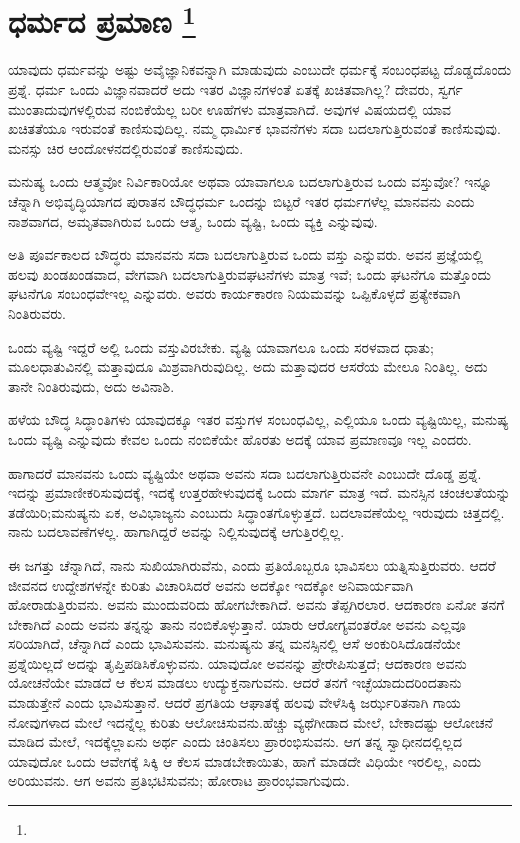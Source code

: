 
\chapter[ಧರ್ಮದ ಪ್ರಮಾಣ ]{ಧರ್ಮದ ಪ್ರಮಾಣ \protect\footnote{}}

ಯಾವುದು ಧರ್ಮವನ್ನು ಅಷ್ಟು ಅವೈಜ್ಞಾನಿಕವನ್ನಾಗಿ ಮಾಡುವುದು ಎಂಬುದೇ ಧರ್ಮಕ್ಕೆ ಸಂಬಂಧಪಟ್ಟ ದೊಡ್ಡದೊಂದು ಪ್ರಶ್ನೆ. ಧರ್ಮ ಒಂದು ವಿಜ್ಞಾನವಾದರೆ ಅದು ಇತರ ವಿಜ್ಞಾನಗಳಂತೆ ಏತಕ್ಕೆ ಖಚಿತವಾಗಿಲ್ಲ? ದೇವರು, ಸ್ವರ್ಗ ಮುಂತಾದುವುಗಳಲ್ಲಿರುವ ನಂಬಿಕೆಯೆಲ್ಲ ಬರೀ ಊಹೆಗಳು ಮಾತ್ರವಾಗಿದೆ. ಅವುಗಳ ವಿಷಯದಲ್ಲಿ ಯಾವ ಖಚಿತತೆಯೂ ಇರುವಂತೆ ಕಾಣಿಸುವುದಿಲ್ಲ. ನಮ್ಮ ಧಾರ್ಮಿಕ ಭಾವನೆಗಳು ಸದಾ ಬದಲಾಗುತ್ತಿರುವಂತೆ ಕಾಣಿಸುವುವು. ಮನಸ್ಸು ಚಿರ ಆಂದೋಳನದಲ್ಲಿರುವಂತೆ ಕಾಣಿಸುವುದು.

ಮನುಷ್ಯ ಒಂದು ಆತ್ಮವೋ ನಿರ್ವಿಕಾರಿಯೋ ಅಥವಾ ಯಾವಾಗಲೂ ಬದಲಾಗುತ್ತಿರುವ ಒಂದು ವಸ್ತುವೋ? ಇನ್ನೂ ಚೆನ್ನಾಗಿ ಅಭಿವೃದ್ಧಿಯಾಗದ ಪುರಾತನ ಬೌದ್ಧಧರ್ಮ ಒಂದನ್ನು ಬಿಟ್ಟರೆ ಇತರ ಧರ್ಮಗಳೆಲ್ಲ ಮಾನವನು ಎಂದು ನಾಶವಾಗದ, ಅಮೃತವಾಗಿರುವ ಒಂದು ಆತ್ಮ, ಒಂದು ವ್ಯಷ್ಟಿ, ಒಂದು ವ್ಯಕ್ತಿ ಎನ್ನುವುವು.

ಅತಿ ಪೂರ್ವಕಾಲದ ಬೌದ್ಧರು ಮಾನವನು ಸದಾ ಬದಲಾಗುತ್ತಿರುವ ಒಂದು ವಸ್ತು ಎನ್ನುವರು. ಅವನ ಪ್ರಜ್ಞೆಯಲ್ಲಿ ಹಲವು ಖಂಡಖಂಡವಾದ, ವೇಗವಾಗಿ ಬದಲಾಗುತ್ತಿರುವ\break ಘಟನೆಗಳು ಮಾತ್ರ ಇವೆ; ಒಂದು ಘಟನೆಗೂ ಮತ್ತೊಂದು ಘಟನೆಗೂ ಸಂಬಂಧವೇ\break ಇಲ್ಲ ಎನ್ನುವರು. ಅವರು ಕಾರ್ಯಕಾರಣ ನಿಯಮವನ್ನು ಒಪ್ಪಿಕೊಳ್ಳದೆ ಪ್ರತ್ಯೇಕವಾಗಿ ನಿಂತಿರುವರು.

ಒಂದು ವ್ಯಷ್ಟಿ ಇದ್ದರೆ ಅಲ್ಲಿ ಒಂದು ವಸ್ತುವಿರಬೇಕು. ವ್ಯಷ್ಟಿ ಯಾವಾಗಲೂ ಒಂದು ಸರಳವಾದ ಧಾತು; ಮೂಲಧಾತುವಿನಲ್ಲಿ ಮತ್ತಾವುದೂ ಮಿಶ್ರವಾಗಿರುವುದಿಲ್ಲ. ಅದು ಮತ್ತಾವುದರ ಆಸರೆಯ ಮೇಲೂ ನಿಂತಿಲ್ಲ. ಅದು ತಾನೇ ನಿಂತಿರುವುದು, ಅದು ಅವಿನಾಶಿ.

ಹಳೆಯ ಬೌದ್ಧ ಸಿದ್ಧಾಂತಿಗಳು ಯಾವುದಕ್ಕೂ ಇತರ ವಸ್ತುಗಳ ಸಂಬಂಧವಿಲ್ಲ, ಎಲ್ಲಿಯೂ ಒಂದು ವ್ಯಷ್ಟಿಯಿಲ್ಲ, ಮನುಷ್ಯ ಒಂದು ವ್ಯಷ್ಟಿ ಎನ್ನುವುದು ಕೇವಲ ಒಂದು ನಂಬಿಕೆಯೇ ಹೊರತು ಅದಕ್ಕೆ ಯಾವ ಪ್ರಮಾಣವೂ ಇಲ್ಲ ಎಂದರು.

ಹಾಗಾದರೆ ಮಾನವನು ಒಂದು ವ್ಯಷ್ಟಿಯೇ ಅಥವಾ ಅವನು ಸದಾ ಬದಲಾಗು\-ತ್ತಿರುವನೇ ಎಂಬುದೇ ದೊಡ್ಡ ಪ್ರಶ್ನೆ. ಇದನ್ನು ಪ್ರಮಾಣೀಕರಿಸುವುದಕ್ಕೆ, ಇದಕ್ಕೆ ಉತ್ತರ\break ಹೇಳುವುದಕ್ಕೆ ಒಂದು ಮಾರ್ಗ ಮಾತ್ರ ಇದೆ. ಮನಸ್ಸಿನ ಚಂಚಲತೆಯನ್ನು ತಡೆಯಿರಿ;\break ಮನುಷ್ಯನು ಏಕ, ಅವಿಭಾಜ್ಯನು ಎಂಬುದು ಸಿದ್ಧಾಂತಗೊಳ್ಳುತ್ತದೆ. ಬದಲಾವಣೆಯೆಲ್ಲ ಇರುವುದು ಚಿತ್ತದಲ್ಲಿ. ನಾನು ಬದಲಾವಣೆಗಳಲ್ಲ. ಹಾಗಾಗಿದ್ದರೆ ಅವನ್ನು ನಿಲ್ಲಿಸುವುದಕ್ಕೆ ಆಗುತ್ತಿರಲ್ಲಿಲ್ಲ.

ಈ ಜಗತ್ತು ಚೆನ್ನಾಗಿದೆ, ನಾನು ಸುಖಿಯಾಗಿರುವೆನು, ಎಂದು ಪ್ರತಿಯೊಬ್ಬರೂ ಭಾವಿಸಲು ಯತ್ನಿಸುತ್ತಿರುವರು. ಆದರೆ ಜೀವನದ ಉದ್ದೇಶಗಳನ್ನೇ ಕುರಿತು ವಿಚಾರಿಸಿದರೆ ಅವನು ಅದಕ್ಕೋ ಇದಕ್ಕೋ ಅನಿವಾರ್ಯವಾಗಿ ಹೋರಾಡುತ್ತಿರುವನು. ಅವನು ಮುಂದುವರಿದು ಹೋಗಬೇಕಾಗಿದೆ. ಅವನು ತೆಪ್ಪಗಿರಲಾರ. ಆದಕಾರಣ ಏನೋ ತನಗೆ ಬೇಕಾಗಿದೆ ಎಂದು ಅವನು ತನ್ನನ್ನು ತಾನು ನಂಬಿಕೊಳ್ಳುತ್ತಾನೆ. ಯಾರು ಆರೋಗ್ಯವಂತರೋ ಅವನು ಎಲ್ಲವೂ ಸರಿಯಾಗಿದೆ, ಚೆನ್ನಾಗಿದೆ ಎಂದು ಭಾವಿಸುವನು. ಮನುಷ್ಯನು ತನ್ನ ಮನಸ್ಸಿನಲ್ಲಿ ಆಸೆ ಅಂಕುರಿಸಿದೊಡನೆಯೇ ಪ್ರಶ್ನೆಯಿಲ್ಲದೆ ಅದನ್ನು ತೃಪ್ತಿಪಡಿಸಿಕೊಳ್ಳುವನು. ಯಾವುದೋ ಅವನನ್ನು ಪ್ರೇರೇಪಿಸುತ್ತದೆ; ಆದಕಾರಣ ಅವನು ಯೋಚನೆಯೇ ಮಾಡದೆ ಆ ಕೆಲಸ ಮಾಡಲು ಉದ್ಯುಕ್ತನಾಗುವನು. ಆದರೆ ತನಗೆ ಇಚ್ಛೆಯಾದುದರಿಂದ\break ತಾನು ಮಾಡುತ್ತೇನೆ ಎಂದು ಭಾವಿಸುತ್ತಾನೆ. ಆದರೆ ಪ್ರಗತಿಯ ಆಘಾತಕ್ಕೆ ಹಲವು ವೇಳೆ\break ಸಿಕ್ಕಿ ಜರ್ಝರಿತನಾಗಿ ಗಾಯ ನೋವುಗಳಾದ ಮೇಲೆ ಇದನ್ನೆಲ್ಲ ಕುರಿತು ಆಲೋಚಿಸುವನು.\break ಹೆಚ್ಚು ವ್ಯಥೆಗೀಡಾದ ಮೇಲೆ, ಬೇಕಾದಷ್ಟು ಆಲೋಚನೆ ಮಾಡಿದ ಮೇಲೆ, ಇದಕ್ಕೆಲ್ಲಾ\break ಏನು ಅರ್ಥ ಎಂದು ಚಿಂತಿಸಲು ಪ್ರಾರಂಭಿಸುವನು. ಆಗ ತನ್ನ ಸ್ವಾಧೀನದಲ್ಲಿಲ್ಲದ ಯಾವುದೋ ಒಂದು ಆವೇಗಕ್ಕೆ ಸಿಕ್ಕಿ ಆ ಕೆಲಸ ಮಾಡಬೇಕಾಯಿತು, ಹಾಗೆ ಮಾಡದೇ ವಿಧಿಯೇ ಇರಲಿಲ್ಲ, ಎಂದು ಅರಿಯುವನು. ಆಗ ಅವನು ಪ್ರತಿಭಟಿಸುವನು; ಹೋರಾಟ ಪ್ರಾರಂಭವಾಗುವುದು.

